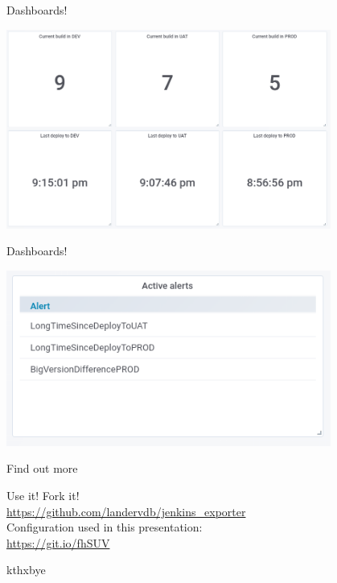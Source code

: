 \documentclass[aspectratio=169,12pt]{beamer}
\begin{document}
\begin{frame}{Dashboards!}
  \begin{center}
    \includegraphics[width=0.8\textwidth]{img/stats.png}
  \end{center}
\end{frame}

\begin{frame}{Dashboards!}
  \begin{center}
    \includegraphics[width=0.8\textwidth]{img/alerts.png}
  \end{center}
\end{frame}

\begin{frame}[fragile]{Find out more}
  \begin{center}
    Use it! Fork it! \\ 
    \url{https://github.com/landervdb/jenkins_exporter} \\ 
    \vspace{20pt}
    Configuration used in this presentation: \\
    \url{https://git.io/fhSUV}
  \end{center}
\end{frame}

\begin{frame}[standout]
  kthxbye
\end{frame}
\end{document}

